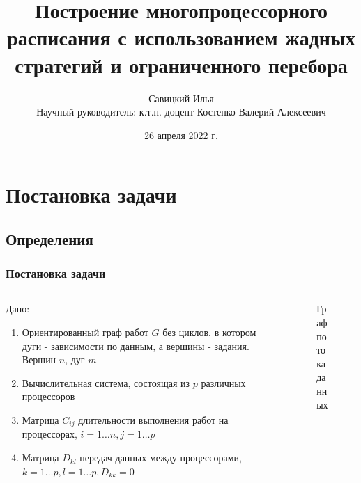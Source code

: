 \documentclass[hyperref=unicode, aspectratio=169]{beamer}
\title{Построение многопроцессорного расписания с использованием жадных стратегий и ограниченного перебора}
\author{Савицкий Илья\\Научный руководитель: к.т.н. доцент Костенко Валерий Алексеевич}
\date{26 апреля 2022 г.}
\begin{document}
\begin{frame}
    \titlepage
\end{frame}


\section{Постановка задачи}
\subsection{Определения}

\begin{frame}
    \frametitle{Постановка задачи}
    \begin{columns}
        \begin{column}{0.6\textwidth}
            Дано:
            \begin{enumerate}
                \item Ориентированный граф работ $G$ без циклов, в котором дуги - зависимости по данным, а вершины - задания. Вершин $n$, дуг $m$
                \item Вычислительная система, состоящая из $p$ различных процессоров
                \item Матрица $C_{ij}$ длительности выполнения работ на процессорах, $i=1 \dots n, j=1 \dots p$
                \item Матрица $D_{kl}$ передач данных между процессорами, $k=1 \dots p, l = 1 \dots p, D_{kk} = 0$
            \end{enumerate}
        \end{column}
        \begin{column}{0.4\textwidth}
            \begin{figure}
                \captionsetup{labelformat=empty}
                \caption{Граф потока данных}    
            \end{figure}
        \end{column}
    \end{columns}
\end{frame}
\end{document}
